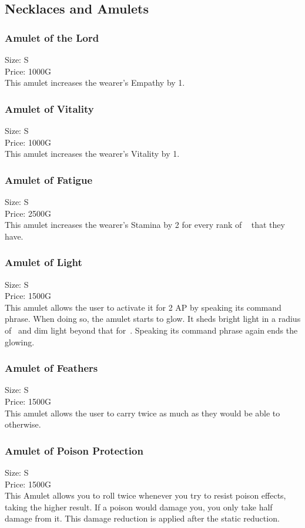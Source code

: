 \subsection{Necklaces and Amulets}\label{subsec:amulets}

\subsubsection{Amulet of the Lord}\label{item:amuletOfLord}
Size: S\\
Price: 1000G\\
This amulet increases the wearer's Empathy by 1.

\subsubsection{Amulet of Vitality}\label{item:amuletOfVitality}
Size: S\\
Price: 1000G\\
This amulet increases the wearer's Vitality by 1.

\subsubsection{Amulet of Fatigue}\label{item:amuletOfFatigue}
Size: S\\
Price: 2500G\\
This amulet increases the wearer's Stamina by 2 for every rank of ~ that they have.

\subsubsection{Amulet of Light}\label{item:amuletOfLight}
Size: S\\
Price: 1500G\\
This amulet allows the user to activate it for 2 AP by speaking its command phrase.
When doing so, the amulet starts to glow.
It sheds bright light in a radius of~ and dim light beyond that for~.
Speaking its command phrase again ends the glowing.

\subsubsection{Amulet of Feathers}\label{item:amuletOfFeathers}
Size: S\\
Price: 1500G\\
This amulet allows the user to carry twice as much as they would be able to otherwise.

\subsubsection{Amulet of Poison Protection}\label{item:amuletOfAntidote}
Size: S\\
Price: 1500G\\
This Amulet allows you to roll twice whenever you try to resist poison effects, taking the higher result.
If a poison would damage you, you only take half damage from it.
This damage reduction is applied after the static reduction.